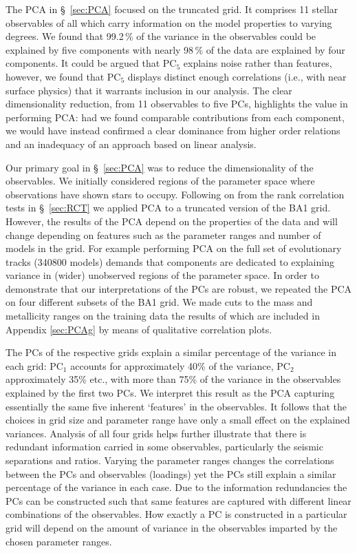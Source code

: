 The PCA in \S~\ref{sec:PCA} focused on the truncated grid. It comprises 11 stellar observables of all which carry information on the model properties to varying degrees. 
 We found that 99.2\,\% of the variance in the observables could be explained by five components with
nearly 98\,\% of the data are explained by four components. It could be argued that PC$_5$ explains noise rather than features, however, we found that PC$_5$ displays distinct enough correlations (i.e., with near surface physics) that it warrants inclusion in our analysis. 
The clear dimensionality reduction, from 11 observables to five PCs,  highlights the value in performing PCA: had we found comparable contributions from each component, we would have instead confirmed a clear dominance from higher order relations and an inadequacy of an approach based on linear analysis. 


Our primary goal in \S~\ref{sec:PCA} was to reduce the dimensionality of the observables.
We initially considered regions of the parameter space where observations have shown stars to occupy. 
Following on from the rank correlation tests in \S~\ref{sec:RCT} we applied PCA to a truncated version of the BA1 grid.  
However, the results of the PCA depend on the properties of the data and will change depending on features such as the parameter ranges and number of models in the grid. 
For example performing PCA on the full set of evolutionary tracks (340800 models) demands that components are dedicated to explaining variance in (wider) unobserved regions of the parameter space. 
In order to demonstrate that our interpretations of the PCs are robust, we repeated the PCA on four different subsets of the BA1 grid. 
 We made cuts to the mass and metallicity ranges on the training data the results of which are included in Appendix \ref{sec:PCAg} by means of qualitative correlation plots. 
 
The PCs of the respective grids explain a similar percentage of the variance in each grid: PC$_1$ accounts for approximately 40\% of the variance,  PC$_2$  approximately 35\%  etc.,  with more than 75\% of the variance in the observables explained by the first two PCs. 
We interpret this result as the PCA capturing essentially the same five inherent `features' in the observables. 
It follows that the choices in grid size and parameter range have only a small effect on the explained variances.
Analysis of all four grids helps further illustrate that there is redundant information carried in some observables, particularly the seismic separations and ratios. 
Varying the parameter ranges changes the correlations between the PCs and observables (loadings) yet the PCs still explain a similar percentage of the variance in each case.  
Due to the information redundancies the PCs can be constructed such that same features are captured with different linear combinations of the observables.
How exactly a PC is constructed in a particular grid will depend on the amount of variance in the observables imparted by the chosen parameter ranges. 


